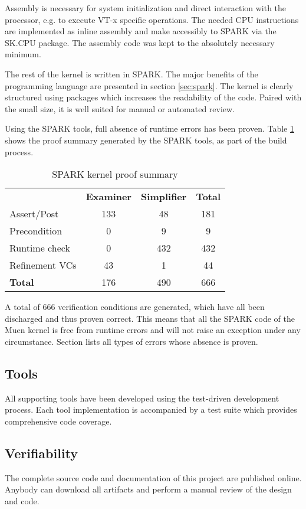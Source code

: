 Assembly is necessary for system initialization and direct interaction with the
processor, e.g. to execute VT-x specific operations. The needed CPU instructions
are implemented as inline assembly and make accessibly to SPARK via the SK.CPU
package. The assembly code was kept to the absolutely necessary minimum.

The rest of the kernel is written in SPARK. The major benefits of the
programming language are presented in section \ref{sec:spark}. The kernel is
clearly structured using packages which increases the readability of the code.
Paired with the small size, it is well suited for manual or automated review.

Using the SPARK tools, full absence of runtime errors has been proven. Table
\ref{tab:kernel-proof-sum} shows the proof summary generated by the SPARK tools,
as part of the build process.

\begin{table}[h]
	\centering
	\begin{tabular}{l c c c}
		& \textbf{Examiner} & \textbf{Simplifier} & \textbf{Total} \\
		Assert/Post    & 133 & 48  & 181 \\
		Precondition   & 0   & 9   & 9   \\
		Runtime check  & 0   & 432 & 432 \\
		Refinement VCs & 43  & 1   & 44 \\
		\hline
		\textbf{Total} & 176 & 490 & 666 \\
	\end{tabular}
	\caption{SPARK kernel proof summary}
	\label{tab:kernel-proof-sum}
\end{table}

A total of 666 verification conditions are generated, which have all been
discharged and thus proven correct. This means that all the SPARK code of the
Muen kernel is free from runtime errors and will not raise an exception under
any circumstance. Section lists all types of errors whose absence is proven.

\subsection{Tools}
All supporting tools have been developed using the test-driven development
process. Each tool implementation is accompanied by a test suite which provides
comprehensive code coverage.

\subsection{Verifiability}
The complete source code and documentation of this project are published online.
Anybody can download all artifacts and perform a manual review of the design and
code.

